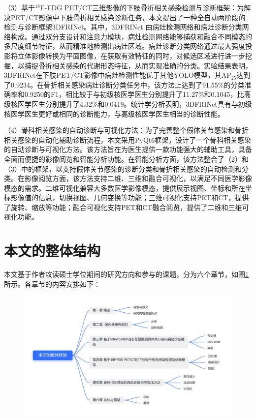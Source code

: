 （3）基于\(^{18}\)F-FDG PET/CT三维影像的下肢骨折相关感染检测与诊断框架：为解决PET/CT影像中下肢骨折相关感染诊断任务，本文提出了一种全自动两阶段的检测与诊断框架3DFRINet。其中，3DFRINet 由病灶检测网络和病灶诊断分类网络构成。通过双分支设计和注意力模块，病灶检测网络能够捕获和融合不同模态的多尺度细节特征，从而精准地检测出病灶区域。病灶诊断分类网络通过最大强度投影将立体影像转换为平面图像，在获取有效特征的同时，对候选区域进行进一步挖掘，以捕捉骨折相关感染的代谢形态特征，从而实现准确的分类。实验结果表明，3DFRINet在下肢PET/CT影像中病灶检测性能优于其他YOLO模型，其AP\(_{25}\)达到了0.9234。在骨折相关感染病灶诊断分类任务中，该方法上达到了91.55\%的分类准确率和0.9250的F1，相比较于与初级核医学医生分别提升了11.27\%和0.1045，比高级核医学医生分别提升了4.32\%和0.0419。统计学分析表明，3DFRINet具有与初级核医学医生更好或相同的诊断能力，与高级核医学医生相当的诊断性能。

（4）骨科相关感染的自动诊断与可视化方法：为了完善整个假体关节感染和骨折相关感染的自动化辅助诊断流程，本文采用PyQt6框架，设计了一个骨科相关感染的自动诊断与可视化方法。该方法旨在为医生提供一款功能强大的辅助工具，具备全面而便捷的影像阅览和智能分析功能。在智能分析方面，该方法整合了（2）和（3）中的框架，以支持假体关节感染的诊断分类和骨折相关感染的自动检测和分类。在影像阅览方面，该方法支持二维、三维和融合可视化，以满足不同医学影像模态的需求。二维可视化兼容大多数医学影像模态，提供展示视图、坐标和所在坐标影像值的信息，切换视图、几何变换等功能；三维可视化支持PET和CT，提供了旋转、缩放等功能；融合可视化支持PET和CT融合阅览，提供了二维和三维可视化功能。

\section{本文的整体结构}

本文基于作者攻读硕士学位期间的研究方向和参与的课题，分为六个章节，如图\ref{fig:chap01_structure}所示。各章节的内容安排如下：

\begin{figure}[htbp]
  \centering
  \includegraphics[width=\textwidth]{figures/chap01_structure_light.jpg}
  \label{fig:chap01_structure}
\end{figure}

